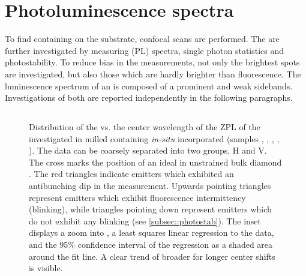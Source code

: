 


\section{Photoluminescence spectra} \label{subsec::spectra}


To find \nds containing \sivs on the substrate, confocal scans are performed.
The \sivs are further investigated by measuring \pl (PL) spectra, single photon statistics and photostability.
To reduce bias in the measurements, not only the brightest spots are investigated, but also those which are hardly brighter than \bkg fluorescence.
The luminescence spectrum of an \siv is composed of a prominent \zpl and weak sidebands.
Investigations of both are reported independently in the following paragraphs.



\subsection{\Zpl}\label{subsubsec::zpl}
	

	\begin{figure}[tp]
		\centering
		\caption{Distribution of the \lw vs. the center wavelength of the ZPL of the investigated \sivs in milled \nds containing \textit{in-situ} incorporated \sivs (samples \insituF, \insituS, \insituSn, \insituSo, \insituH{}). The data can be coarsely separated into two groups, H and V. The cross marks the position of an ideal \siv in unstrained bulk diamond \cite{Arend2016a}. The red triangles indicate emitters which exhibited an antibunching dip in the \gtz measurement. Upwards pointing triangles represent emitters which exhibit fluorescence intermittency (blinking), while triangles pointing down represent emitters which do not exhibit any blinking (see \autoref{subsec::photostab}). The inset displays a zoom into \vl, a least squares linear regression to the data, and the 95\% confidence interval of the regression as a shaded area around the fit line. A clear trend of broader \lws for longer \ZPL center shifts is visible.}
		\label{fig::bimodal_distr}
	\end{figure}


